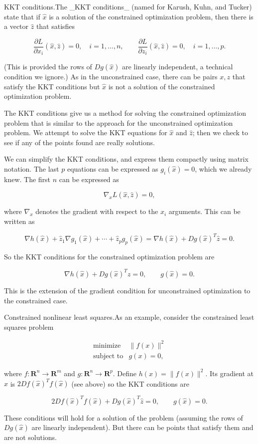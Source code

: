 KKT conditions.The _KKT conditions_ (named for Karush, Kuhn, and Tucker) state that if \(\hat{x}\) is a solution of the constrained optimization problem, then there is a vector \(\hat{z}\) that satisfies

\[\frac{\partial L}{\partial x_{i}}(\hat{x},\hat{z})=0,\quad i=1,\ldots,n,\qquad \frac{\partial L}{\partial z_{i}}(\hat{x},\hat{z})=0,\quad i=1,\ldots,p.\]

(This is provided the rows of \(Dg(\hat{x})\) are linearly independent, a technical condition we ignore.) As in the unconstrained case, there can be pairs \(x,z\) that satisfy the KKT conditions but \(\hat{x}\) is not a solution of the constrained optimization problem.

The KKT conditions give us a method for solving the constrained optimization problem that is similar to the approach for the unconstrained optimization problem. We attempt to solve the KKT equations for \(\hat{x}\) and \(\hat{z}\); then we check to see if any of the points found are really solutions.

We can simplify the KKT conditions, and express them compactly using matrix notation. The last \(p\) equations can be expressed as \(g_{i}(\hat{x})=0\), which we already knew. The first \(n\) can be expressed as

\[\nabla_{x}L(\hat{x},\hat{z})=0,\]

where \(\nabla_{x}\) denotes the gradient with respect to the \(x_{i}\) arguments. This can be written as

\[\nabla h(\hat{x})+\hat{z}_{1}\nabla g_{1}(\hat{x})+\cdots+\hat{z}_{p}g_{p}( \hat{x})=\nabla h(\hat{x})+Dg(\hat{x})^{T}\hat{z}=0.\]

So the KKT conditions for the constrained optimization problem are

\[\nabla h(\hat{x})+Dg(\hat{x})^{T}\hat{z}=0,\qquad g(\hat{x})=0.\]

This is the extension of the gradient condition for unconstrained optimization to the constrained case.

Constrained nonlinear least squares.As an example, consider the constrained least squares problem

\[\begin{array}{ll}\mbox{minimize}&\|f(x)\|^{2}\\ \mbox{subject to}&g(x)=0,\end{array}\]

where \(f:\mathbf{R}^{n}\to\mathbf{R}^{m}\) and \(g:\mathbf{R}^{n}\to\mathbf{R}^{p}\). Define \(h(x)=\|f(x)\|^{2}\). Its gradient at \(\hat{x}\) is \(2Df(\hat{x})^{T}f(\hat{x})\) (see above) so the KKT conditions are

\[2Df(\hat{x})^{T}f(\hat{x})+Dg(\hat{x})^{T}\hat{z}=0,\qquad g(\hat{x})=0.\]

These conditions will hold for a solution of the problem (assuming the rows of \(Dg(\hat{x})\) are linearly independent). But there can be points that satisfy them and are not solutions.

 